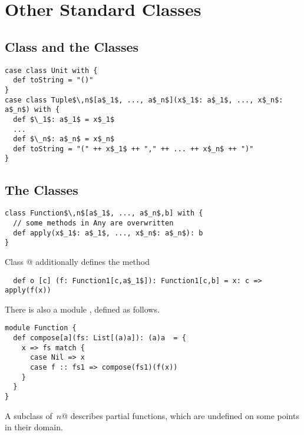\documentclass[11pt]{report}
\begin{document}
\section{Other Standard Classes}

\subsection{Class  and the  Classes}
\label{sec:cls-tuple}

\begin{verbatim}
case class Unit with {
  def toString = "()"
}
case class Tuple$\,n$[a$_1$, ..., a$_n$](x$_1$: a$_1$, ..., x$_n$: a$_n$) with {
  def $\_1$: a$_1$ = x$_1$
  ...
  def $\_n$: a$_n$ = x$_n$
  def toString = "(" ++ x$_1$ ++ "," ++ ... ++ x$_n$ ++ ")"
}
\end{verbatim}

\subsection{The  Classes}
\label{sec:cls-function}

\begin{verbatim}
class Function$\,n$[a$_1$, ..., a$_n$,b] with {
  // some methods in Any are overwritten
  def apply(x$_1$: a$_1$, ..., x$_n$: a$_n$): b
}
\end{verbatim}
Class @ additionally defines the method
\begin{verbatim}
  def o [c] (f: Function1[c,a$_1$]): Function1[c,b] = x: c => apply(f(x))
\end{verbatim}
There is also a module \verb@Function@, defined as follows.
\begin{verbatim}
module Function {
  def compose[a](fs: List[(a)a]): (a)a  = {
    x => fs match {
      case Nil => x
      case f :: fs1 => compose(fs1)(f(x))
    }
  }
}
\end{verbatim}
A subclass of \verb@Function$\,n$@ describes partial functions, which
are undefined on some points in their domain.
\end{document}
